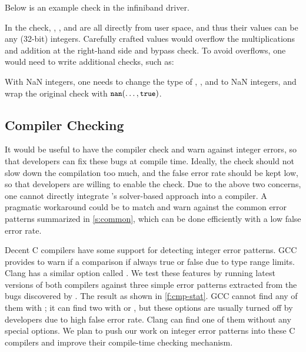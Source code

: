 Below is an example check in the infiniband driver.

In the check, , , and  are
all directly from user space, and thus their values can be any
(32-bit) integers.  Carefully crafted values would overflow the
multiplications and addition at the right-hand side and bypass
check.  To avoid overflows, one would need to write additional
checks, such as:

With NaN integers, one needs to change the type of
, , and  to NaN integers,
and wrap the original check with $\cc{nan}(\dots, \cc{true})$.

\fi


\subsection{Compiler Checking}

It would be useful to have the compiler check and warn against
integer errors, so that developers can fix these bugs
at compile time.  Ideally, the check should not slow down
the compilation too much, and the false error rate should be kept low,
so that developers are willing to enable the check.
%
Due to the above two concerns, one cannot directly integrate
\sys's solver-based approach into a compiler.  A pragmatic workaround
could be to match and warn against the common error patterns
summarized in \autoref{s:common}, which can be done efficiently
with a low false error rate.

Decent C compilers have some support for detecting integer error
patterns.
%
GCC provides  to warn if a comparison if always
true or false due to type range limits.
%
Clang has a similar option called .
%
We test these features by running latest versions of both compilers
against three simple error patterns extracted from the bugs discovered
by \sys.  The result as shown in \autoref{f:cmp-stat}.  GCC cannot
find any of them with ; it can find two with 
or , but these options are usually turned off by
developers due to high false error rate.  Clang can find one of them
without any special options.
%
%
We plan to push our work on integer error patterns into these C
compilers and improve their compile-time checking mechanism.

